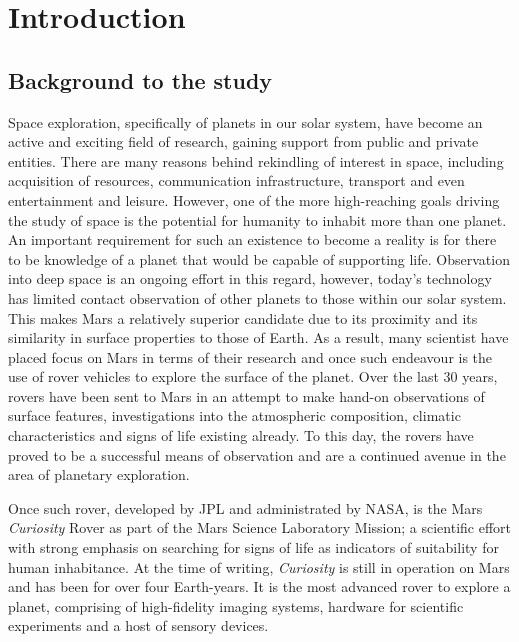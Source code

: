 \chapter{Introduction}
\section{Background to the study}
  Space exploration, specifically of planets in our solar system, have become an active and exciting field of research, gaining support from public and private entities. There are many reasons behind rekindling of interest in space, including acquisition of resources, communication infrastructure, transport and even entertainment and leisure. However, one of the more high-reaching goals driving the study of space is the potential for humanity to inhabit more than one planet. An important requirement for such an existence to become a reality is for there to be knowledge of a planet that would be capable of supporting life. Observation into deep space is an ongoing effort in this regard, however, today's technology has limited contact observation of other planets to those within our solar system. This makes Mars a relatively superior candidate due to its proximity and its similarity in surface properties to those of Earth. As a result, many scientist have placed focus on Mars in terms of their research and once such endeavour is the use of rover vehicles to explore the surface of the planet. Over the last 30 years, rovers have been sent to Mars in an attempt to make hand-on observations of surface features, investigations into the atmospheric composition, climatic characteristics and signs of life existing already. To this day, the rovers have proved to be a successful means of observation and are a continued avenue in the area of planetary exploration.
  
  Once such rover, developed by JPL and administrated by NASA, is the Mars \textit{Curiosity} Rover as part of the Mars Science Laboratory Mission; a scientific effort with strong emphasis on searching for signs of life as indicators of suitability for human inhabitance. At the time of writing, \textit{Curiosity} is still in operation on Mars and has been for over four Earth-years. It is the most advanced rover to explore a planet, comprising of high-fidelity imaging systems, hardware for scientific experiments and a host of sensory devices.
  
